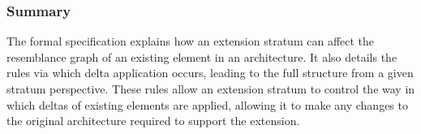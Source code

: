 \subsubsection{Summary}

The formal specification explains how an extension stratum can affect
the resemblance graph of an existing element in an architecture. It
also details the rules via which delta application occurs, leading
to the full structure from a given stratum perspective. These rules
allow an extension stratum to control the way in which deltas of existing
elements are applied, allowing it to make any changes to the original
architecture required to support the extension.

